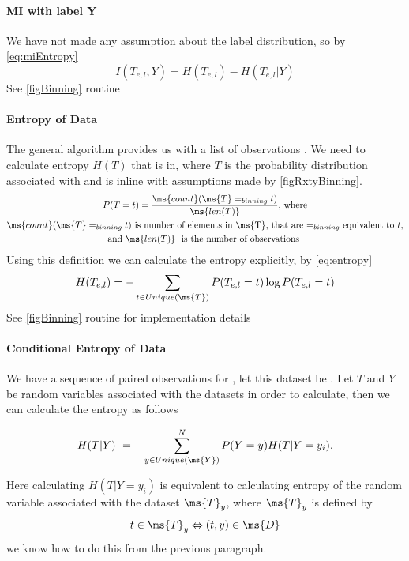 \documentclass[dissertation.tex]{subfiles}
\begin{document}
\paragraph{MI with label Y}
We have not made any assumption about the label distribution, so by
\autoref{eq:miEntropy}
\begin{equation}
  I(T_{e,l}, Y) = H(T_{e,l}) - H(T_{e,l}|Y)
\end{equation}
See \autoref{figBinning} routine 

\paragraph{Entropy of Data}
The general algorithm provides us with a list of observations .
We need to calculate entropy $H(T)$ that is in, where $T$ is the probability
distribution associated with  and is inline with assumptions made by
\autoref{figRxtyBinning}.
\begin{gather}
  P(T = t) = \frac{\ms{count}(\ms{T} =_{binning} t)}{\ms{len(T)}}
  \text{, where}\\
  \ms{count}(\ms{T} =_{binning} t)
  \text{ is number of elements in \ms{T}, that are $=_{binning}$ equivalent to }t,
  \nonumber\\
  \text{and }
  \ms{len(T)}\
  \text{ is the number of observations }\nonumber
\end{gather}
Using this definition we can calculate the entropy explicitly, by
\autoref{eq:entropy}
\begin{equation}
  H(T_{e,l})=-\sum _{t\in{Unique(\ms{T})}}{P (T_{e,l}=t)\log P(T_{e,l}=t)}
\end{equation}
See \autoref{figBinning} routine  for implementation details

\paragraph{Conditional Entropy of Data}
We have a sequence of paired observations  for ,
let this dataset be \ms{D}. Let $T$ and $Y$ be random variables associated with
the datasets in order to calculate, then we can calculate the entropy as follows


\begin{equation}
  H(T|Y)\ =-\sum _{y\in{Unique(\ms{Y})}}^NP(Y=y)H(T|Y=y_i).
\end{equation}

Here calculating $H(T|Y=y_i)$ is equivalent to calculating entropy of the random
variable associated with the dataset $\ms{T}_y$, where $\ms{T}_y$ is defined by
\begin{equation}
  t\in\ms{T}_y
  \Leftrightarrow
  (t,y)\in\ms{D}
\end{equation}
we know how to do this from the previous paragraph.
\end{document}
